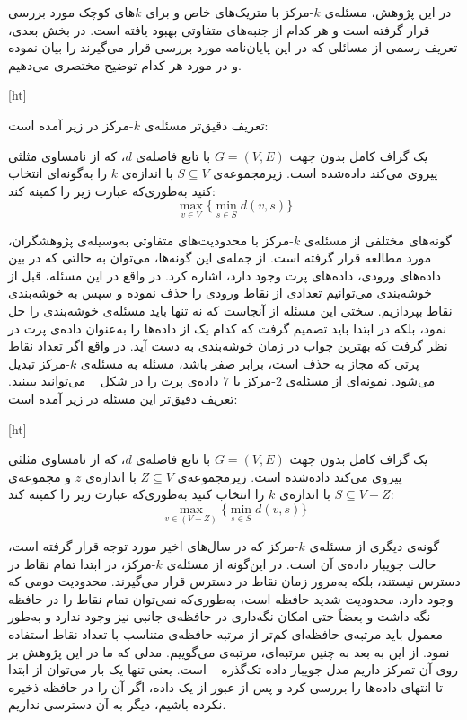 در این پژوهش، مسئله‌ی $k$-مرکز با متریک‌های خاص و برای $k$های کوچک مورد بررسی قرار گرفته است و هر کدام از‌ جنبه‌های متفاوتی بهبود یافته است.
در بخش بعدی، تعریف رسمی از مسائلی که در این پایان‌نامه مورد بررسی قرار می‌گیرند را بیان نموده و در مورد هر کدام توضیح مختصری می‌دهیم.

[ht]


تعریف دقیق‌تر مسئله‌ی $k$-مرکز در زیر آمده است:

 یک گراف کامل بدون جهت $G = (V, E)$ با تابع فاصله‌ی $d$، که از نامساوی مثلثی پیروی می‌کند داده‌شده است.
زیرمجموعه‌ی $S \subseteq V$ با اندازه‌ی $k$ را به‌گونه‌ای انتخاب کنید به‌طوری‌که عبارت زیر را کمینه کند:
$$\max_{v \in V} \{ \min_{s \in S} d(v, s) \}$$

گونه‌های مختلفی از مسئله‌ی $k$-مرکز با محدودیت‌های متفاوتی به‌وسیله‌ی پژوهشگران، مورد مطالعه قرار گرفته است.
از جمله‌ی این گونه‌ها، می‌توان به حالتی که در بین داده‌های ورودی، داده‌های پرت وجود دارد، اشاره کرد.
در واقع در این مسئله، قبل از خوشه‌بندی می‌توانیم تعدادی از نقاط ورودی را حذف نموده و سپس به خوشه‌بندی نقاط بپردازیم.
سختی این مسئله از آنجاست که نه تنها باید مسئله‌ی خوشه‌بندی را حل نمود، بلکه در ابتدا باید تصمیم گرفت که کدام یک از داده‌ها را به‌عنوان داده‌ی پرت در نظر گرفت که بهترین جواب در زمان خوشه‌بندی به دست آید.
در واقع اگر تعداد نقاط پرتی که مجاز به حذف است، برابر صفر باشد، مسئله به مسئله‌ی $k$-مرکز تبدیل می‌شود.
نمونه‌ای از مسئله‌ی $2$-مرکز با $7$ داده‌ی پرت را در شکل ~ می‌توانید ببینید.
تعریف دقیق‌تر این مسئله در زیر آمده است:

[ht]


 یک گراف کامل بدون جهت $G = (V, E)$ با تابع فاصله‌ی $d$، که از نامساوی مثلثی پیروی می‌کند داده‌شده است.
زیرمجموعه‌ی $Z \subseteq V$ با اندازه‌ی $z$ و  مجموعه‌ی $S \subseteq V - Z$ با اندازه‌ی $k$ را انتخاب کنید به‌طوری‌که عبارت زیر را کمینه کند:
$$\max_{v \in (V - Z)} \{ \min_{s \in S} d(v, s) \}$$

گونه‌ی دیگری از مسئله‌ی $k$-مرکز که در سال‌های اخیر مورد توجه قرار گرفته است، حالت جویبار داده‌ی آن است.
در این‌گونه از مسئله‌ی $k$-مرکز، در ابتدا تمام نقاط در دسترس نیستند، بلکه به‌مرور زمان نقاط در دسترس قرار می‌گیرند.
محدودیت دومی که وجود دارد، محدودیت شدید حافظه است، به‌طوری‌که نمی‌توان تمام نقاط را در حافظه نگه داشت و بعضاً حتی امکان نگه‌داری در حافظه‌ی جانبی نیز وجود ندارد و به‌طور معمول باید مرتبه‌ی حافظه‌ای کم‌تر از مرتبه حافظه‌ی  متناسب با تعداد نقاط استفاده نمود.
از این به بعد به چنین مرتبه‌ای، مرتبه‌ی  می‌گوییم.
مدلی که ما در این پژوهش بر روی آن تمرکز داریم مدل جویبار داده تک‌گذره ~ است.
یعنی تنها یک بار می‌توان از ابتدا تا انتهای داده‌ها را بررسی کرد و پس از عبور از یک داده، اگر آن را در حافظه ذخیره نکرده باشیم، دیگر به آن دسترسی نداریم.


